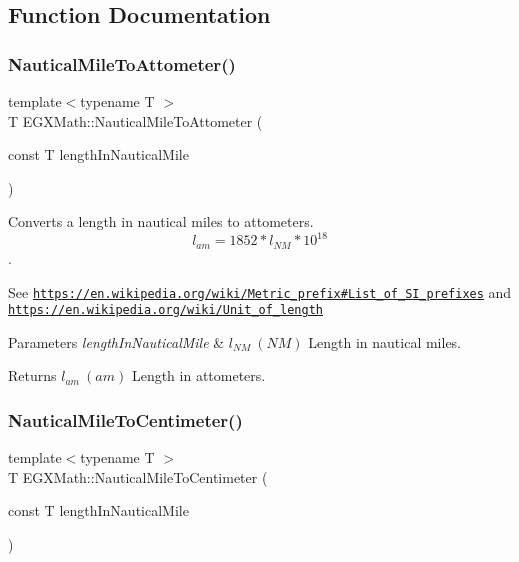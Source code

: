 \subsection{Function Documentation}
\mbox{\label{group___e_g_x_math-_conversions-_length_conversions-_non-_s_i-_nautical_mile-_s_i_ga18a7668c4fb069dd5955fd010bff4db5}} 
\subsubsection{\texorpdfstring{Nautical\+Mile\+To\+Attometer()}{NauticalMileToAttometer()}}
{\footnotesize\ttfamily template$<$typename T $>$ \\
T E\+G\+X\+Math\+::\+Nautical\+Mile\+To\+Attometer (\begin{DoxyParamCaption}\item[{const T}]{length\+In\+Nautical\+Mile }\end{DoxyParamCaption})}



Converts a length in nautical miles to attometers. \[ l_{am}=1852 * l_{NM} * 10^{18} \]. 

See \href{https://en.wikipedia.org/wiki/Metric_prefix#List_of_SI_prefixes}{\tt https\+://en.\+wikipedia.\+org/wiki/\+Metric\+\_\+prefix\#\+List\+\_\+of\+\_\+\+S\+I\+\_\+prefixes} and \href{https://en.wikipedia.org/wiki/Unit_of_length}{\tt https\+://en.\+wikipedia.\+org/wiki/\+Unit\+\_\+of\+\_\+length} 
\begin{DoxyParams}{Parameters}
{\em length\+In\+Nautical\+Mile} & $ l_{NM}\ (NM)$ Length in nautical miles. \\
\hline
\end{DoxyParams}
\begin{DoxyReturn}{Returns}
$ l_{am}\ (am)$ Length in attometers. 
\end{DoxyReturn}
\mbox{\label{group___e_g_x_math-_conversions-_length_conversions-_non-_s_i-_nautical_mile-_s_i_gae387f69d6b598c6f2381c33684fd9afe}} 
\subsubsection{\texorpdfstring{Nautical\+Mile\+To\+Centimeter()}{NauticalMileToCentimeter()}}
{\footnotesize\ttfamily template$<$typename T $>$ \\
T E\+G\+X\+Math\+::\+Nautical\+Mile\+To\+Centimeter (\begin{DoxyParamCaption}\item[{const T}]{length\+In\+Nautical\+Mile }\end{DoxyParamCaption})}



